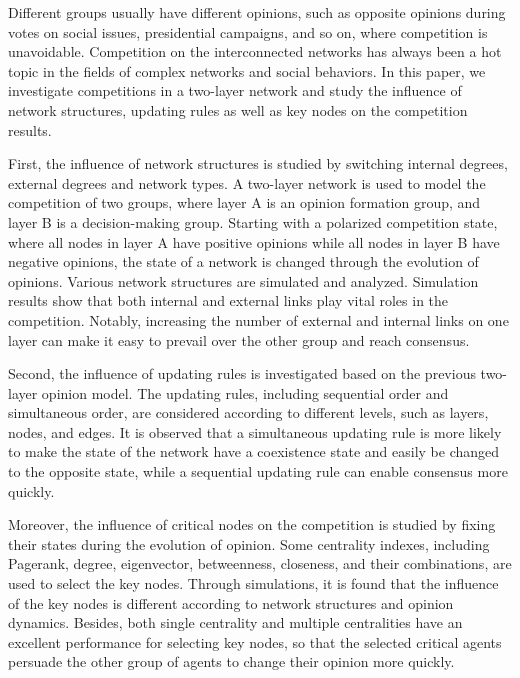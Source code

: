 \begin{englishabstract}
	
Different groups usually have different opinions, such as opposite opinions during votes on social issues, presidential campaigns, and so on, where competition is unavoidable. Competition on the interconnected networks has always been a hot topic in the fields of complex networks and social behaviors. In this paper, we investigate competitions in a two-layer network and study the influence of network structures, updating rules as well as key nodes on the competition results.

First, the influence of network structures is studied by switching internal degrees, external degrees and network types. A two-layer network is used to model the competition of two groups, where layer A is an opinion formation group, and layer B is a decision-making group. Starting with a polarized competition state, where all nodes in layer A have positive opinions while all nodes in layer B have negative opinions, the state of a network is changed through the evolution of opinions. Various network structures are simulated and analyzed. Simulation results show that both internal and external links play vital roles in the competition. Notably, increasing the number of external and internal links on one layer can make it easy to prevail over the other group and reach consensus.

Second, the influence of updating rules is investigated based on the previous two-layer opinion model. The updating rules, including sequential order and simultaneous order, are considered according to different levels, such as layers, nodes, and edges. It is observed that a simultaneous updating rule is more likely to make the state of the network have a coexistence state and easily be changed to the opposite state, while a sequential updating rule can enable consensus more quickly.

Moreover, the influence of critical nodes on the competition is studied by fixing their states during the evolution of opinion. Some centrality indexes, including Pagerank, degree, eigenvector, betweenness, closeness, and their combinations, are used to select the key nodes. Through simulations, it is found that the influence of the key nodes is different according to network structures and opinion dynamics. Besides, both single centrality and multiple centralities have an excellent performance for selecting key nodes, so that the selected critical agents persuade the other group of agents to change their opinion more quickly.\\ 

\end{englishabstract}

